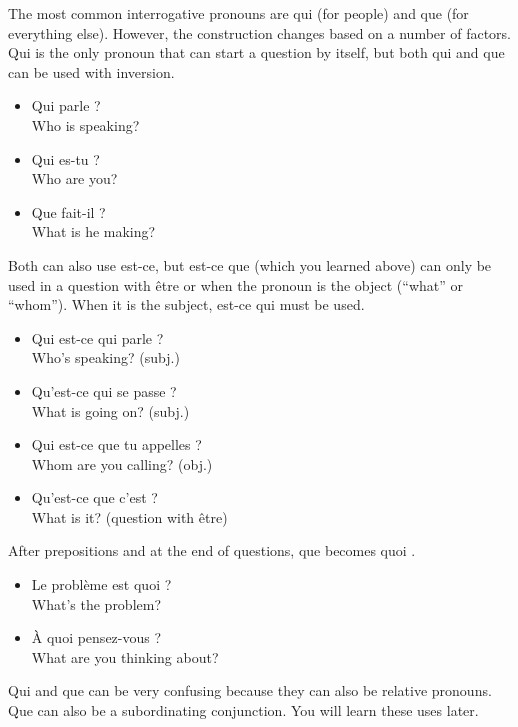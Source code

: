 The most common interrogative pronouns are \guillemotleft qui \guillemotright (for people) and \guillemotleft que \guillemotright (for everything else). However, the construction changes based on a number of factors. Qui is the only pronoun that can start a question by itself, but both qui and que can be used with inversion.

\begin{itemize}
  \item  Qui parle ? \\ Who is speaking?
  \item  Qui es-tu ? \\ Who are you?
  \item  Que fait-il ? \\ What is he making?
\end{itemize}

Both can also use est-ce, but est-ce que (which you learned above) can only be used in a question with {\^e}tre or when the pronoun is the object (``what'' or ``whom''). When it is the subject, est-ce qui must be used.

\begin{itemize}
  \item  Qui est-ce qui parle ? \\ Who's speaking? (subj.)
  \item  Qu'est-ce qui se passe ? \\ What is going on? (subj.)
  \item  Qui est-ce que tu appelles ? \\ Whom are you calling? (obj.)
  \item  Qu'est-ce que c'est ? \\ What is it? (question with {\^e}tre)
\end{itemize}

After prepositions and at the end of questions, \guillemotleft que \guillemotright becomes \guillemotleft quoi \guillemotright .

\begin{itemize}
  \item  Le probl{\`e}me est quoi ? \\ What's the problem?
  \item  {\`A} quoi pensez-vous ? \\ What are you thinking about?
\end{itemize}

Qui and que can be very confusing because they can also be relative pronouns. Que can also be a subordinating conjunction. You will learn these uses later.

